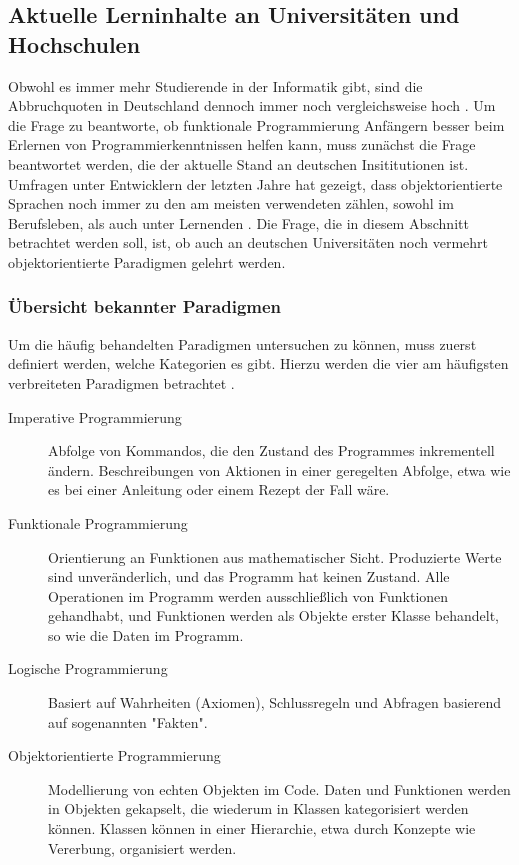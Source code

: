 \subsection{Aktuelle Lerninhalte an Universitäten und Hochschulen}
Obwohl es immer mehr Studierende in der Informatik gibt, sind die Abbruchquoten in Deutschland dennoch immer noch vergleichsweise hoch \cite{dhzw}. Um die Frage zu beantworte, ob funktionale Programmierung Anfängern besser beim Erlernen von Programmierkenntnissen helfen kann, muss zunächst die Frage beantwortet werden, die der aktuelle Stand an deutschen Insititutionen ist.
Umfragen unter Entwicklern der letzten Jahre hat gezeigt, dass objektorientierte Sprachen noch immer zu den am meisten verwendeten zählen, sowohl im Berufsleben, als auch unter Lernenden \cite{stackoverflow}. Die Frage, die in diesem Abschnitt betrachtet werden soll, ist, ob auch an deutschen Universitäten noch vermehrt objektorientierte Paradigmen gelehrt werden.

\subsubsection{Übersicht bekannter Paradigmen}
Um die häufig behandelten Paradigmen untersuchen zu können, muss zuerst definiert werden, welche Kategorien es gibt. Hierzu werden die vier am häufigsten verbreiteten Paradigmen betrachtet \cite{normark}.

\begin{description}
    \item[Imperative Programmierung] Abfolge von Kommandos, die den Zustand des Programmes inkrementell ändern. Beschreibungen von Aktionen in einer geregelten Abfolge, etwa wie es bei einer Anleitung oder einem Rezept der Fall wäre.
    \item[Funktionale Programmierung] Orientierung an Funktionen aus mathematischer Sicht. Produzierte Werte sind unveränderlich, und das Programm hat keinen Zustand. Alle Operationen im Programm werden ausschließlich von Funktionen gehandhabt, und Funktionen werden als Objekte erster Klasse behandelt, so wie die Daten im Programm.
    \item[Logische Programmierung] Basiert auf Wahrheiten (Axiomen), Schlussregeln und Abfragen basierend auf sogenannten "Fakten".
    \item[Objektorientierte Programmierung] Modellierung von echten Objekten im Code. Daten und Funktionen werden in Objekten gekapselt, die wiederum in Klassen kategorisiert werden können. Klassen können in einer Hierarchie, etwa durch Konzepte wie Vererbung, organisiert werden.
\end{description}

